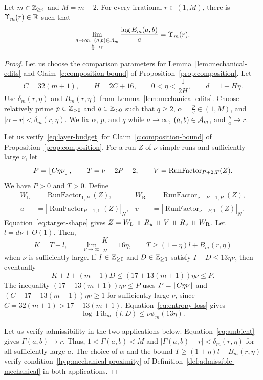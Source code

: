 \begin{theorem}\label{thm:irrational-large-m}
Let $m\in\mathbb Z_{\ge4}$ and $M=m-2$.
For every irrational $r\in(1,M)$, there is $\Upsilon_m(r)\in\mathbb R$ such that
\[
 \lim_{\substack{a\to\infty,\ (a,b)\in\cA_m\\\frac{b}{a}\to r}}
 \frac{\log E_m(a,b)}a=\Upsilon_m(r).
\]
\end{theorem}
\begin{proof}
Let us choose the comparison parameters for Lemma~\ref{lem:mechanical-edits} and Claim~\ref{c:composition-bound} of Proposition~\ref{prop:composition}.
Let
\[
 C=32(m+1),\qquad H=2C+16,
 \qquad 0<\eta<\frac1{2H},\qquad d=1-H\eta.
\]
Use $\delta_m(r,\eta)$ and $B_m(r,\eta)$ from Lemma~\ref{lem:mechanical-edits}.
Choose relatively prime $p\in\mathbb Z_{>0}$ and $q\in\mathbb Z_{>0}$ such that $q\ge2$,
$\alpha=\frac{p}{q}\in(1,M)$, and $|\alpha-r|<\delta_m(r,\eta)$.
We fix $\alpha$, $p$, and $q$ while $a\to\infty$, $(a,b)\in\mathcal A_m$, and $\frac ba\to r$.

Let us verify~\eqref{eq:layer-budget} for Claim~\ref{c:composition-bound} of Proposition~\ref{prop:composition}.
For a run $Z$ of $\nu$ simple runs and sufficiently large $\nu$, let
\[
 P=\left\lfloor C\eta\nu\right\rfloor,\qquad T=\nu-2P-2,\qquad
 V=\operatorname{RunFactor}_{P+2,T}(Z).
\]
We have $P>0$ and $T>0$. Define
\[
\begin{aligned}
 W_{\mathrm L}&=\operatorname{RunFactor}_{1,P}(Z),&
 W_{\mathrm R}&=\operatorname{RunFactor}_{\nu-P+1,P}(Z),\\
 u&=|\operatorname{RunFactor}_{P+1,1}(Z)|_N,&
 v&=|\operatorname{RunFactor}_{\nu-P,1}(Z)|_N.
\end{aligned}
\]
Equation~\eqref{eq:target-shape} gives $Z=W_{\mathrm L}\ccn R_u\ccn V\ccn R_v\ccn W_{\mathrm R}$.
Let $l=d\nu+O(1)$. Then,
\[
 K=T-l,\qquad \lim_{\nu\to\infty}\frac K\nu=16\eta,\qquad
 T\ge(1+\eta)l+B_m(r,\eta)
\]
when $\nu$ is sufficiently large. If $I\in\mathbb Z_{\ge0}$ and $D\in\mathbb Z_{\ge0}$ satisfy $I+D\le13\eta\nu$, then eventually
\[
 K+I+(m+1)D\le(17+13(m+1))\eta \nu\le P.
\]
The inequality $(17+13(m+1))\eta\nu\le P$ uses $P=\left\lfloor C\eta\nu\right\rfloor$ and
$(C-17-13(m+1))\eta\nu\ge1$ for sufficiently large $\nu$, since
$C=32(m+1)>17+13(m+1)$. Equation~\eqref{eq:entropy-loss} gives
\[
 \log \operatorname{Fib}_m(l,D)\le\nu\psi_m(13\eta).
\]

Let us verify admissibility in the two applications below.
Equation~\eqref{eq:ambient} gives $\Gamma(a,b)\to r$.
Thus, $1<\Gamma(a,b)<M$ and $|\Gamma(a,b)-r|<\delta_m(r,\eta)$ for all sufficiently large $a$.
The choice of $\alpha$ and the bound $T\ge(1+\eta)l+B_m(r,\eta)$ verify condition~\ref{hyp:mechanical-proximity} of Definition~\ref{def:admissible-mechanical} in both applications.


\end{proof}
